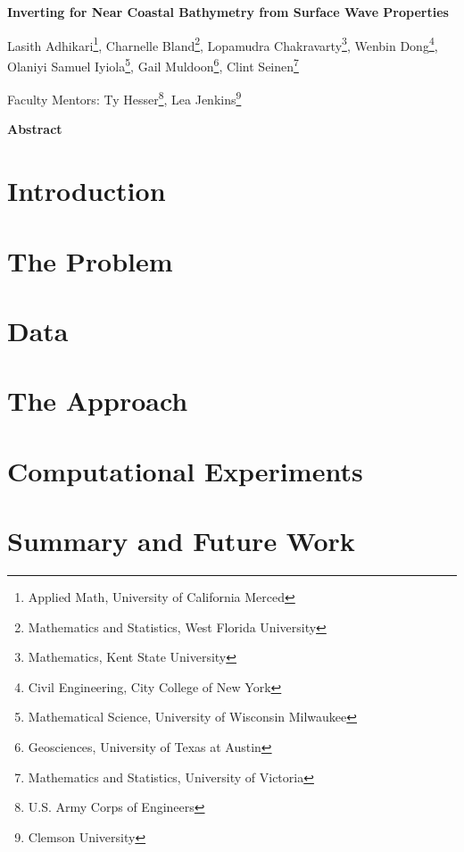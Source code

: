 \documentclass[10pt]{article}
\begin{document}
\centerline{\large \bf Inverting for Near Coastal Bathymetry from Surface Wave Properties}

\vspace{.1truein}

\def\thefootnote{\arabic{footnote}}
\begin{center}
  Lasith Adhikari\footnote{Applied Math, University of California Merced},
  Charnelle Bland\footnote{Mathematics and Statistics, West Florida University},
  Lopamudra Chakravarty\footnote{Mathematics, Kent State University},
  Wenbin Dong\footnote{Civil Engineering, City College of New York},\\
  Olaniyi Samuel Iyiola\footnote{Mathematical Science, University of Wisconsin Milwaukee},
  Gail Muldoon\footnote{Geosciences, University of Texas at Austin},
  Clint Seinen\footnote{Mathematics and Statistics, University of Victoria}
\end{center}


\begin{center}
Faculty Mentors: Ty Hesser\footnote{U.S. Army Corps of Engineers},
Lea Jenkins\footnote{Clemson University}
\end{center}


\vspace{.3truein}
\centerline{\bf Abstract}



\section{Introduction}


\section{The Problem}


\section{Data}





\section{The Approach}


\section{Computational Experiments}


\section{Summary and Future Work}


%


\end{document}

